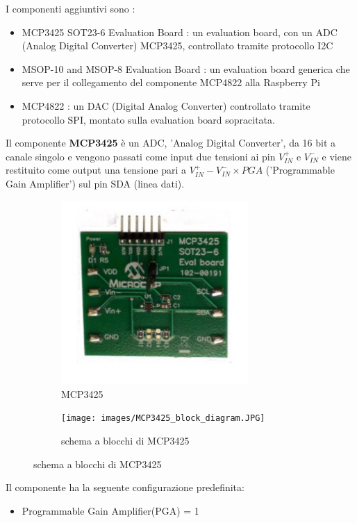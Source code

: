 \documentclass[12pt, a4paper, titlepage, oneside]{book}
\begin{document}
\begin{flushleft}
I componenti aggiuntivi sono :
\begin{itemize}
    \item MCP3425 SOT23-6 Evaluation Board  \cite{microchipMCP3425}: un evaluation board, con un ADC (Analog Digital Converter) MCP3425, controllato tramite protocollo I2C
    \item MSOP-10 and MSOP-8 Evaluation Board \cite{microchipMSOP10-8}: un evaluation board generica che serve per il collegamento del componente MCP4822 alla Raspberry Pi
    \item MCP4822 \cite{microchipMCP4822}: un DAC (Digital Analog Converter) controllato tramite protocollo SPI, montato sulla evaluation board sopracitata.
\end{itemize}
\newpage
Il componente \textbf{MCP3425} è un ADC, 'Analog Digital Converter', da 16 bit a canale singolo e vengono passati come input due tensioni ai pin $V_{IN}^+ $ e $ V_{IN}^-$ e viene restituito come output una tensione pari a $V_{IN}^+ - V_{IN}^- \times PGA$ ('Programmable Gain Amplifier') sul pin SDA (linea dati).\\ 
\begin{figure}[h]
\begin{subfigure}{0.5\textwidth}
    \includegraphics[width=0.9\linewidth, height=7cm]{MCP3425.JPG}
    \caption{MCP3425}
    \label{fig:MCP3425}
\end{subfigure}
\begin{subfigure}{0.5\textwidth}
    \texttt{[image: images/MCP3425\_block\_diagram.JPG]}
    \caption{schema a blocchi di MCP3425}
    \label{fig:MCP3425 block diagram}
\end{subfigure}
\end{figure}
Il componente ha la seguente configurazione predefinita:
\begin{itemize}
    \item Programmable Gain Amplifier(PGA) = 1

\end{itemize}
\end{flushleft}
\end{document}
